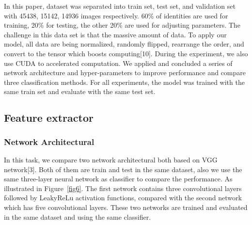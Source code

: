 \documentclass[runningheads]{llncs}
\begin{document}
In this paper, dataset was separated into train set, test set, and validation set with 45438, 15142, 14936 images respectively. 60\% of identities are used for training, 20\% for testing, the other 20\% are used for adjusting parameters. The challenge in this data set is that the massive amount of data. To apply our model, all data are being normalized, randomly flipped, rearrange the order, and convert to the tensor which boosts computing[10]. During the experiment, we also use CUDA to accelerated computation. We applied and concluded a series of network architecture and hyper-parameters to improve performance and compare three classification methods. For all experiments, the model was trained with the same train set and evaluate with the same test set.

\subsection{Feature extractor}
\subsubsection{Network Architectural}
In this task, we compare two network architectural both based on VGG network[3]. Both of them are train and test in the same dataset, also we use the same three-layer neural network as classifier to compare the performance. As illustrated in Figure~\ref{fig6}. The first network contains three convolutional layers followed by LeakyReLu activation functions, compared with the second network which has five convolutional layers. These two networks are trained and evaluated in the same dataset and using the same classifier.
\end{document}
